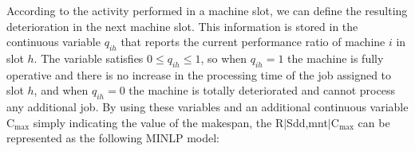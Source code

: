 \documentclass[a4paper,11pt]{article}
\begin{document}
According to the activity performed in a machine slot, we can define the resulting deterioration in the next machine slot. This information is stored in the continuous variable $q_{ih}$ that reports the current performance ratio of machine $i$ in slot $h$. The variable satisfies $0 \leq q_{ih} \leq 1$, so when $q_{ih}=1$ the machine is fully operative and there is no increase in the processing time of the job assigned to slot $h$, and when $q_{ih}=0$ the machine is totally deteriorated and cannot process any additional job. By using these variables and an additional continuous variable C$_{\max}$ simply indicating the value of the makespan, the  R$|$Sdd,mnt$|$C$_{\max}$ can be represented as the following MINLP model: 
\end{document}
